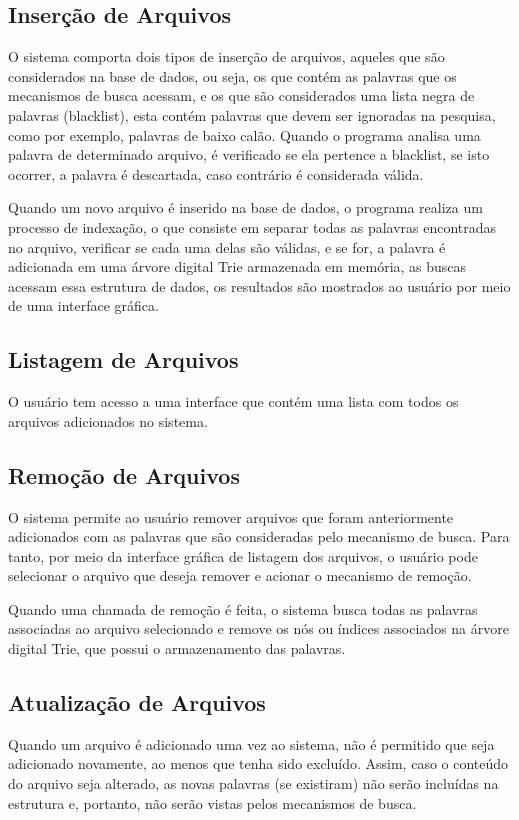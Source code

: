 \documentclass[12pt]{article}
\begin{document}
\subsection{Inserção de Arquivos}

O sistema comporta dois tipos de inserção de arquivos, aqueles que são considerados na base de dados, ou seja, os que contém as palavras que os mecanismos de busca acessam, e os que são considerados uma lista negra de palavras (blacklist), esta contém palavras que devem ser ignoradas na pesquisa, como por exemplo, palavras de baixo calão. Quando o programa analisa uma palavra de determinado arquivo, é verificado se ela pertence a blacklist, se isto ocorrer, a palavra é descartada, caso contrário é considerada válida. 

Quando um novo arquivo é inserido na base de dados, o programa realiza um processo de indexação, o que consiste em separar todas as palavras encontradas no arquivo, verificar se cada uma delas são válidas, e se for, a palavra é adicionada em uma árvore digital Trie armazenada em memória, as buscas acessam essa estrutura de dados, os resultados são mostrados ao usuário por meio de uma interface gráfica.

\subsection{Listagem de Arquivos}
O usuário tem acesso a uma interface que contém uma lista com todos os arquivos adicionados no sistema.

\subsection{Remoção de Arquivos}
O sistema permite ao usuário remover arquivos que foram anteriormente adicionados com as palavras que são consideradas pelo mecanismo de busca. Para tanto, por meio da interface gráfica de listagem dos arquivos, o usuário pode selecionar o arquivo que deseja remover e acionar o mecanismo de remoção.

	Quando uma chamada de remoção é feita, o sistema busca todas as palavras associadas ao arquivo selecionado e remove os nós ou índices associados na árvore digital Trie, que possui o armazenamento das palavras.

\subsection{Atualização de Arquivos}
Quando um arquivo é adicionado uma vez ao sistema, não é permitido que seja adicionado novamente, ao menos que tenha sido excluído. Assim, caso o conteúdo do arquivo seja alterado, as novas palavras (se existiram) não serão incluídas na estrutura e, portanto, não serão vistas pelos mecanismos de busca.
\end{document}
